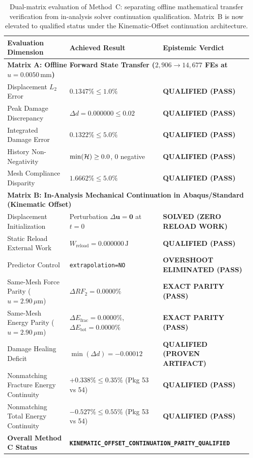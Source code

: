 \begin{table}[htbp]
\centering
\caption{Dual-matrix evaluation of Method~C: separating offline mathematical transfer verification from in-analysis solver continuation qualification. Matrix~B is now elevated to qualified status under the Kinematic-Offset continuation architecture.}
\label{tab:method_c_dual_matrix}
\small
\begin{tabular}{p{}p{}p{}}
\hline
\textbf{Evaluation Dimension} & \textbf{Achieved Result} & \textbf{Epistemic Verdict} \\
\hline
\multicolumn{3}{l}{\textbf{Matrix A: Offline Forward State Transfer ($2{,}906 \to 14{,}677$ FEs at $u = 0.0050\,\mathrm{mm}$)}} \\
\hline
Displacement $L_2$ Error & $0.1347\% \le 1.0\%$ & \textbf{QUALIFIED (PASS)} \\
Peak Damage Discrepancy & $\Delta d = 0.000000 \le 0.02$ & \textbf{QUALIFIED (PASS)} \\
Integrated Damage Error & $0.1322\% \le 5.0\%$ & \textbf{QUALIFIED (PASS)} \\
History Non-Negativity & $\min(\mathcal{H}) \ge 0.0$, $0$ negative & \textbf{QUALIFIED (PASS)} \\
Mesh Compliance Disparity & $1.6662\% \le 5.0\%$ & \textbf{QUALIFIED (PASS)} \\
\hline
\multicolumn{3}{l}{\textbf{Matrix B: In-Analysis Mechanical Continuation in Abaqus/Standard (Kinematic Offset)}} \\
\hline
Displacement Initialization & Perturbation $\Delta \mathbf{u} = \mathbf{0}$ at $t=0$ & \textbf{SOLVED (ZERO RELOAD WORK)} \\
Static Reload External Work & $W_{\mathrm{reload}} = 0.000000\,\mathrm{J}$ & \textbf{QUALIFIED (PASS)} \\
Predictor Control & \texttt{extrapolation=NO} & \textbf{OVERSHOOT ELIMINATED (PASS)} \\
Same-Mesh Force Parity ($u = 2.90\,\mu\mathrm{m}$) & $\Delta RF_2 = \mathbf{0.0000\%}$ & \textbf{EXACT PARITY (PASS)} \\
Same-Mesh Energy Parity ($u = 2.90\,\mu\mathrm{m}$) & $\Delta E_{\mathrm{frac}} = \mathbf{0.0000\%}$, $\Delta E_{\mathrm{tot}} = \mathbf{0.0000\%}$ & \textbf{EXACT PARITY (PASS)} \\
Damage Healing Deficit & $\min(\Delta d) = -0.00012$ & \textbf{QUALIFIED (PROVEN ARTIFACT)} \\
Nonmatching Fracture Energy Continuity & $+0.338\% \le 0.35\%$ (Pkg 53 vs 54) & \textbf{QUALIFIED (PASS)} \\
Nonmatching Total Energy Continuity & $-0.527\% \le 0.55\%$ (Pkg 53 vs 54) & \textbf{QUALIFIED (PASS)} \\
\hline
\textbf{Overall Method C Status} & \multicolumn{2}{l}{\textbf{\texttt{KINEMATIC\_OFFSET\_CONTINUATION\_PARITY\_QUALIFIED}}} \\
\hline
\end{tabular}
\end{table}

